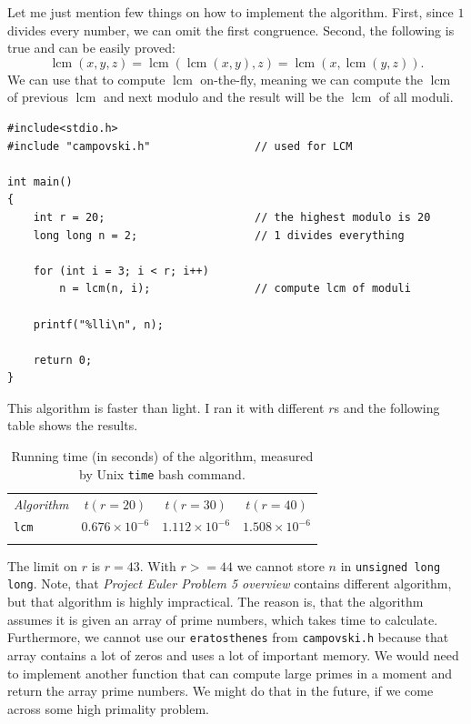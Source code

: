 \documentclass{book}
\DeclareMathOperator{\lcm}{lcm}
\begin{document}
Let me just mention few things on how to implement the algorithm. First, since $1$ divides every number, we can omit the first congruence. Second, the following is true and can be easily proved: \[\lcm(x,y,z) = \lcm(\lcm(x,y), z) = \lcm(x, \lcm(y,z)).\] We can use that to compute $\lcm$ on-the-fly, meaning we can compute the $\lcm$ of previous $\lcm$ and next modulo and the result will be the $\lcm$ of all moduli.

\begin{verbatim}
#include<stdio.h>
#include "campovski.h"                // used for LCM

int main()
{
    int r = 20;                       // the highest modulo is 20
    long long n = 2;                  // 1 divides everything

    for (int i = 3; i < r; i++)
        n = lcm(n, i);                // compute lcm of moduli

    printf("%lli\n", n);

    return 0;
}
\end{verbatim}

This algorithm is faster than light. I ran it with different $r$s and the following table shows the results.

\begin{table}[h!]
\centering
\begin{tabular}{||l||c|c|c||}
\hhline{|t:====:t|}
\textit{Algorithm} & $t(r = 20)$ & $t(r = 30)$ & $t(r = 40)$ \\ \hhline{||=||=|=|=||}
\texttt{lcm} & $0.676 \times 10^{-6}$ & $1.112 \times 10^{-6}$ & $1.508 \times 10^{-6}$ \\ \hhline{|b:====:b|}
\end{tabular}
\caption{Running time (in seconds) of the algorithm, measured by Unix \texttt{time} bash command.}
\end{table}

The limit on $r$ is $r = 43$. With $r >= 44$ we cannot store $n$ in \texttt{unsigned long long}. Note, that \textit{Project Euler Problem 5 overview} contains different algorithm, but that algorithm is highly impractical. The reason is, that the algorithm assumes it is given an array of prime numbers, which takes time to calculate. Furthermore, we cannot use our \texttt{eratosthenes} from \texttt{campovski.h} because that array contains a lot of zeros and uses a lot of important memory. We would need to implement another function that can compute large primes in a moment and return the array prime numbers. We might do that in the future, if we come across some high primality problem.
\end{document}
